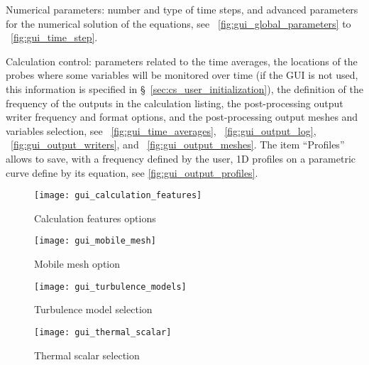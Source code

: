 {{{\begin{list}{-}{}
\item Numerical parameters: number and type of time steps, and advanced parameters for the numerical solution of the equations,
see \figurename~\ref{fig:gui_global_parameters} to \figurename~\ref{fig:gui_time_step}.
\item Calculation control: parameters related to the time averages, the
      locations of the probes where some variables will be monitored over time
      (if the GUI is not used, this information is specified in \S~\ref{sec:cs_user_initialization}),
       the definition of the frequency of the outputs in the calculation
      listing, the post-processing output writer frequency and format options, and
      the post-processing output meshes and variables selection, see
      \figurename~\ref{fig:gui_time_averages}, \figurename~\ref{fig:gui_output_log}, \figurename~\ref{fig:gui_output_writers},
      and \figurename~\ref{fig:gui_output_meshes}. The item ``Profiles'' allows to save, with a
      frequency defined by the user, 1D profiles on a parametric curve define by its equation, see \figurename\ref{fig:gui_output_profiles}.
\end{list}

\begin{figure}[!ht]
\begin{center}
\texttt{[image: gui\_calculation\_features]}
\caption{Calculation features options}
\label{fig:gui_calculation_features}
\end{center}
\end{figure}

\begin{figure}[!ht]
\begin{center}
\texttt{[image: gui\_mobile\_mesh]}
\caption{Mobile mesh option}
\label{fig:gui_mobile_mesh}
\end{center}
\end{figure}

\begin{figure}[!ht]
\begin{center}
\texttt{[image: gui\_turbulence\_models]}
\caption{Turbulence model selection}
\label{fig:gui_turbulence_models}
\end{center}
\end{figure}

\begin{figure}[!ht]
\begin{center}
\texttt{[image: gui\_thermal\_scalar]}
\caption{Thermal scalar selection}
\label{fig:gui_thermal_scalar}
\end{center}
\end{figure}

}}}
